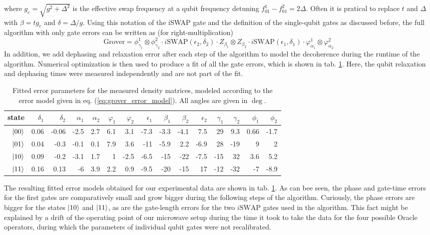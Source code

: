 where $g_e = \sqrt{g^2+\Delta^2}$ is the effective swap frequency at a qubit frequency detuning $f_{01}^1-f_{01}^2 = 2\Delta$. Often it is pratical to replace $t$ and $\Delta$ with $\beta = t g_{e}$ and $\delta = \Delta / g$. Using this notation of the iSWAP gate and the definition of the single-qubit gates as discussed before, the full algorithm with only gate errors can be written as (for right-multiplication)
%
\begin{equation}
\mathrm{Grover} = \phi_{\gamma_1}^1\otimes \phi_{\gamma_2}^2\cdot i\mathrm{SWAP}(\epsilon_2,\delta_2)\cdot Z_{\beta_1}\otimes Z_{\beta_2}\cdot i\mathrm{SWAP}(\epsilon_1,\delta_1)\cdot\varphi_{\alpha_1}^1\otimes \varphi_{\alpha_2}^2 \label{eq:grover_error_model}
\end{equation}
%
In addition, we add dephasing and relaxation error after each step of the algorithm to model the decoherence during the runtime of the algorithm. Numerical optimization is then used to produce a fit of all the gate errors, which is shown in tab. \ref{tab:grover_error_parameters}. Here, the qubit relaxation and dephasing times were measured independently and are not part of the fit.

\begin{table}[ht!]
\centering
\footnotesize{
\begin{tabular}{r|rrrrrrrrrrrrrr}
state & $\delta_1$ & $\delta_2$ & $\alpha_1$ & $\alpha_2$ & $\varphi_1$ & $\varphi_2$ & $\epsilon_1$ & $\beta_1$ & $\beta_2$ & $\epsilon_2$ & $\gamma_1$ & $\gamma_2$ & $\phi_1$ & $\phi_2$ \\ \hline
$\left| 00 \right>$ & 0.06 & -0.06 & -2.5 & 2.7 & 6.1 & 3.1 & -7.3 & -3.3 & -4.1 & 7.5 & 29 & 9.3 & 0.66 & -1.7
 \\
$\left| 01 \right>$ & 0.04 & -0.3 & -0.1 & 0.1 & 7.9 & 3.6 & -11 & -5.9 & 2.2 & -6.9 & 28 & -19 &  9 &  2
 \\
$\left| 10 \right>$ & 0.09 & -0.2 & -3.1 & 1.7 &  1 & -2.5 & -6.5 & -15 & -22 & -7.5 & -15 & 32 & 3.6 & 5.2
\\
$\left| 11 \right>$ & 0.16 & 0.13 & -6 & 3.9 & 2.2 & 0.9 & -9.5 & -20 & -15 & 17 & -12 & -32 & -7 & -8.9
\end{tabular}
}
\caption[Fitted gate error parameters of the Grover algorithm]{Fitted error parameters for the measured density matrices, modeled according to the error model given in eq. (\ref{eq:grover_error_model}). All angles are given in $\deg$.}
\label{tab:grover_error_parameters}
\end{table}

The resulting fitted error models obtained for our experimental data are shown in tab. \ref{tab:grover_error_parameters}. As can bee seen, the phase and gate-time errors for the first gates are comparatively small and grow bigger during the following steps of the algorithm. Curiously, the phase errors are bigger for the states $\left| 10 \right>$ and $\left| 11 \right>$, as are the gate-length errors for the two $i\mathrm{SWAP}$ gates used in the algorithm. This fact might be explained by a drift of the operating point of our microwave setup during the time it took to take the data for the four possible Oracle operators, during which the parameters of individual qubit gates were not recalibrated.

